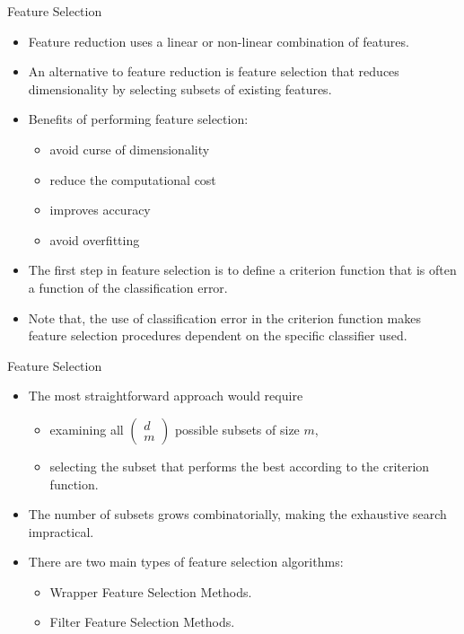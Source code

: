 \begin{frame}{Feature Selection}
\begin{itemize}
\item Feature reduction uses a linear or non-linear combination of features.
\item An alternative to feature reduction is {\color{mycolor2}feature selection} that
reduces dimensionality by selecting subsets of existing
features.
\item Benefits of performing feature selection:
\begin{itemize}
\item avoid curse of dimensionality
\item reduce the computational cost
\item improves accuracy
\item avoid overfitting
\end{itemize}
\item The first step in feature selection is to define a criterion
function that is often a function of the classification error.
\item Note that, the use of classification error in the criterion function makes feature selection procedures dependent on
the specific classifier used.
\end{itemize}
\end{frame}

\begin{frame}{Feature Selection}
\begin{itemize}
\item The most straightforward approach would require
\begin{itemize}
\item examining all $\left( {\begin{array}{*{20}{c}}
d\\
m
\end{array}} \right)$ possible subsets of size $m$,
\item selecting the subset that performs the best according to the criterion function.
\end{itemize}
\item The number of subsets grows combinatorially, making the
exhaustive search impractical.
\item There are two main types of feature selection algorithms:
\begin{itemize}
\item Wrapper Feature Selection Methods.
\item Filter Feature Selection Methods.
\end{itemize}
\end{itemize}
\end{frame}

